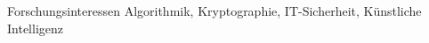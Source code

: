 \begin{rubric}{Forschungsinteressen}
\entry* Algorithmik, Kryptographie, IT-Sicherheit, Künstliche Intelligenz
\end{rubric}